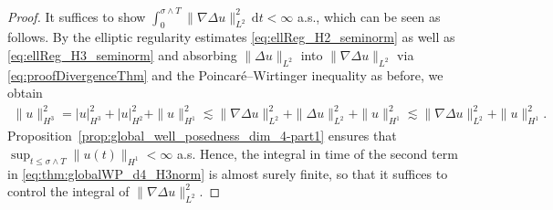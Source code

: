 \documentclass[10pt,a4paper]{amsart}
\newcommand{\dt}{\,\mathrm{d}t}
\newcommand{\grad}{\nabla}
\begin{document}
\begin{proof}
It suffices to show $\int_0^{\sigma\wedge T} \|\grad \Delta u\|^2_{L^2} \dt <\infty$ a.s., which can be seen as follows. By the elliptic regularity estimates \eqref{eq:ellReg_H2_seminorm} as well as \eqref{eq:ellReg_H3_seminorm} and absorbing $\|\Delta u\|_{L^2}$ into $\|\grad\Delta u\|_{L^2}$ via \eqref{eq:proofDivergenceThm} and the Poincaré--Wirtinger inequality as before, we obtain
\begin{align}\label{eq:thm:globalWP_d4_H3norm}
    \|u\|_{H^3}^2 = |u|_{H^3}^2+|u|_{H^2}^2 +\|u\|_{H^1}^2
    \lesssim \|\grad\Delta u\|_{L^2}^2+\|\Delta u\|_{L^2}^2+\|u\|_{H^1}^2 \lesssim \|\grad\Delta u\|_{L^2}^2+\|u\|_{H^1}^2.
\end{align} 
Proposition~\ref{prop:global_well_posedness_dim_4-part1} ensures that $\sup_{t\le \sigma \land T} \|u(t)\|_{H^1}<\infty$ a.s. Hence, the integral in time of the second 
term in \eqref{eq:thm:globalWP_d4_H3norm} 
is almost surely finite, so that it suffices to control the integral of $\|\grad\Delta u\|_{L^2}^2$. 


\end{proof}
\end{document}
